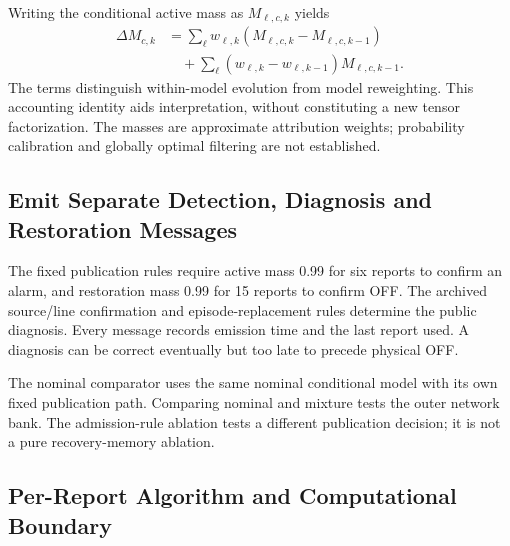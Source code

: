 Writing the conditional active mass as $M_{\ell,c,k}$ yields
\begin{align}
 \Delta M_{c,k}&=\sum_\ell w_{\ell,k}
               (M_{\ell,c,k}-M_{\ell,c,k-1})\nonumber\\
 &\quad+\sum_\ell(w_{\ell,k}-w_{\ell,k-1})M_{\ell,c,k-1}.
 \label{eq:continuous-delta}
\end{align}
The terms distinguish within-model evolution from model reweighting.
This accounting identity aids interpretation, without constituting a new
tensor factorization. The masses are approximate attribution weights;
probability calibration and globally optimal filtering are not established.

\subsection{Emit Separate Detection, Diagnosis and Restoration Messages}

The fixed publication rules require active mass 0.99 for six reports to
confirm an alarm, and restoration mass 0.99 for 15 reports to confirm OFF.
The archived source/line confirmation and episode-replacement rules
determine the public diagnosis. Every message records emission time and
the last report used. A diagnosis can be correct eventually but too late
to precede physical OFF.

The nominal comparator uses the same nominal conditional model with its
own fixed publication path. Comparing nominal and mixture tests the outer
network bank. The admission-rule ablation tests a different publication
decision; it is not a pure recovery-memory ablation.

\subsection{Per-Report Algorithm and Computational Boundary}


